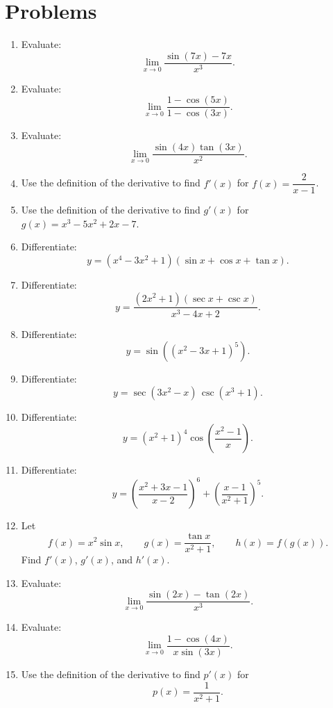 \documentclass[12pt]{article}
\begin{document}
\section*{Problems}
\begin{enumerate}[leftmargin=*, itemsep=1em, topsep=0.8em]
  \item Evaluate:
  \[
  \lim_{x\to 0}\frac{\sin(7x)-7x}{x^3}.
  \]

  \item Evaluate:
  \[
  \lim_{x\to 0}\frac{1-\cos(5x)}{1-\cos(3x)}.
  \]

  \item Evaluate:
  \[
  \lim_{x\to 0}\frac{\sin(4x)\tan(3x)}{x^2}.
  \]

  \item Use the definition of the derivative to find $f'(x)$ for $f(x)=\dfrac{2}{x-1}$.

  \item Use the definition of the derivative to find $g'(x)$ for $g(x)=x^3-5x^2+2x-7$.

  \item Differentiate:
  \[
  y=(x^4-3x^2+1)(\sin x+\cos x+\tan x).
  \]

  \item Differentiate:
  \[
  y=\frac{(2x^2+1)(\sec x+\csc x)}{x^3-4x+2}.
  \]

  \item Differentiate:
  \[
  y=\sin\!\left((x^2-3x+1)^5\right).
  \]

  \item Differentiate:
  \[
  y=\sec(3x^2-x)\,\csc(x^3+1).
  \]

  \item Differentiate:
  \[
  y=(x^2+1)^4\cos\!\left(\frac{x^2-1}{x}\right).
  \]

  \item Differentiate:
  \[
  y=\left(\frac{x^2+3x-1}{x-2}\right)^6+\left(\frac{x-1}{x^2+1}\right)^5.
  \]

  \item Let
  \[
  f(x)=x^2\sin x,\qquad g(x)=\frac{\tan x}{x^2+1},\qquad h(x)=f(g(x)).
  \]
  Find $f'(x)$, $g'(x)$, and $h'(x)$.

  \item Evaluate:
  \[
  \lim_{x\to 0}\frac{\sin(2x)-\tan(2x)}{x^3}.
  \]

  \item Evaluate:
  \[
  \lim_{x\to 0}\frac{1-\cos(4x)}{x\sin(3x)}.
  \]

  \item Use the definition of the derivative to find $p'(x)$ for
  \[
  p(x)=\frac{1}{x^2+1}.
  \]


\end{enumerate}
\end{document}

